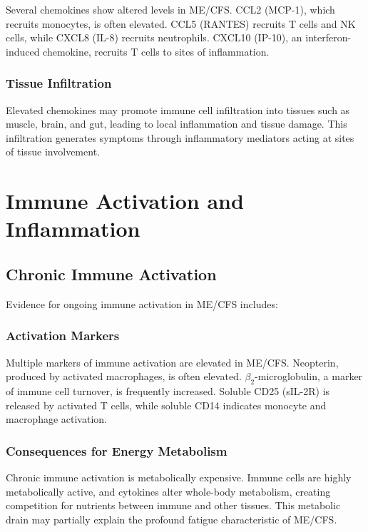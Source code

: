 Several chemokines show altered levels in ME/CFS. CCL2 (MCP-1), which recruits monocytes, is often elevated. CCL5 (RANTES) recruits T cells and NK cells, while CXCL8 (IL-8) recruits neutrophils. CXCL10 (IP-10), an interferon-induced chemokine, recruits T cells to sites of inflammation.

\subsubsection{Tissue Infiltration}

Elevated chemokines may promote immune cell infiltration into tissues such as muscle, brain, and gut, leading to local inflammation and tissue damage. This infiltration generates symptoms through inflammatory mediators acting at sites of tissue involvement.

\section{Immune Activation and Inflammation}
\label{sec:immune-activation}

\subsection{Chronic Immune Activation}
\label{sec:chronic-activation}

Evidence for ongoing immune activation in ME/CFS includes:

\subsubsection{Activation Markers}

Multiple markers of immune activation are elevated in ME/CFS. Neopterin, produced by activated macrophages, is often elevated. $\beta_2$-microglobulin, a marker of immune cell turnover, is frequently increased. Soluble CD25 (sIL-2R) is released by activated T cells, while soluble CD14 indicates monocyte and macrophage activation.

\subsubsection{Consequences for Energy Metabolism}

Chronic immune activation is metabolically expensive. Immune cells are highly metabolically active, and cytokines alter whole-body metabolism, creating competition for nutrients between immune and other tissues. This metabolic drain may partially explain the profound fatigue characteristic of ME/CFS.

